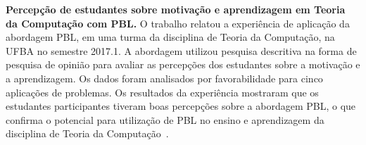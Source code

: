 \item{\textbf{Percepção de estudantes sobre
motivação e aprendizagem em Teoria da
Computação com \ac{PBL}.}
O trabalho relatou a experiência de aplicação da abordagem
\ac{PBL}, em uma turma da disciplina de Teoria da Computação, na
\ac{UFBA} no semestre 2017.1.
A abordagem utilizou pesquisa descritiva na forma de pesquisa
de opinião para avaliar as percepções dos estudantes sobre
a motivação e a aprendizagem.
Os dados foram analisados por favorabilidade para cinco
aplicações de problemas.
Os resultados da experiência mostraram que os estudantes
participantes tiveram boas percepções sobre a abordagem \ac{PBL},
o que confirma o potencial para utilização de \ac{PBL}
no ensino e aprendizagem da disciplina de Teoria
da Computação~\cite{gavaza2018}.}
